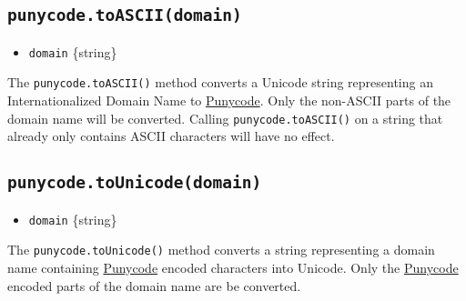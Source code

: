 \subsection{\texorpdfstring{\texttt{punycode.toASCII(domain)}}{punycode.toASCII(domain)}}\label{punycode.toasciidomain}

\begin{itemize}
\tightlist
\item
  \texttt{domain} \{string\}
\end{itemize}

The \texttt{punycode.toASCII()} method converts a Unicode string
representing an Internationalized Domain Name to
\href{https://tools.ietf.org/html/rfc3492}{Punycode}. Only the non-ASCII
parts of the domain name will be converted. Calling
\texttt{punycode.toASCII()} on a string that already only contains ASCII
characters will have no effect.

\begin{Shaded}
\begin{Highlighting}[]
\NormalTok{(}\NormalTok{)}\OperatorTok{;}  
\NormalTok{(}\NormalTok{)}\OperatorTok{;}   
\NormalTok{(}\NormalTok{)}\OperatorTok{;} 
\end{Highlighting}
\end{Shaded}

\subsection{\texorpdfstring{\texttt{punycode.toUnicode(domain)}}{punycode.toUnicode(domain)}}\label{punycode.tounicodedomain}

\begin{itemize}
\tightlist
\item
  \texttt{domain} \{string\}
\end{itemize}

The \texttt{punycode.toUnicode()} method converts a string representing
a domain name containing
\href{https://tools.ietf.org/html/rfc3492}{Punycode} encoded characters
into Unicode. Only the
\href{https://tools.ietf.org/html/rfc3492}{Punycode} encoded parts of
the domain name are be converted.


